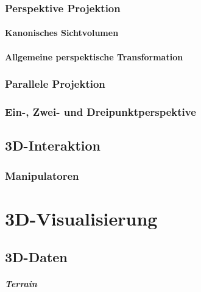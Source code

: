 \documentclass[a4paper, 11pt, accentcolor = tud3b]{tudreport}
\begin{document}
			\subsection{Perspektive Projektion} %

				\subsubsection{Kanonisches Sichtvolumen} %

				\subsubsection{Allgemeine perspektische Transformation} %

			\subsection{Parallele Projektion} %

			\subsection{Ein-, Zwei- und Dreipunktperspektive} %

		\section{3D-Interaktion} %

			\subsection{Manipulatoren} %

	\chapter{3D-Visualisierung} %

		\section{3D-Daten} %

			\paragraph{Terrain} %
\end{document}
